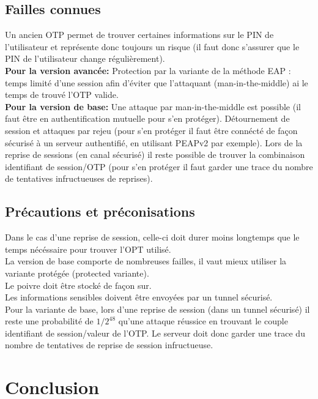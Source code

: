 \documentclass{article}
\begin{document}
\subsection{Failles connues}
    Un ancien OTP permet de trouver certaines informations sur le PIN de l'utilisateur et représente donc toujours un risque (il faut donc s'assurer que le PIN de l'utilisateur change régulièrement).\\

   \textbf{ Pour la version avancée:}
    Protection par la variante de la méthode EAP : temps limité d'une session afin d'éviter que l'attaquant (man-in-the-middle) ai le temps de trouvé l'OTP valide.\\
    
    \textbf{Pour la version de base:}
    Une attaque par man-in-the-middle est possible (il faut être en authentification mutuelle pour s'en protéger).
    Détournement de session et attaques par rejeu (pour s'en protéger il faut être connécté de façon sécurisé à un serveur authentifié, en utilisant PEAPv2 par exemple).
    Lors de la reprise de sessions (en canal sécurisé) il reste possible de trouver la combinaison identifiant de session/OTP (pour s'en protéger il faut garder une trace du nombre de tentatives infructueuses de reprises).

\subsection{Précautions et préconisations}
    Dans le cas d'une reprise de session, celle-ci doit durer moins longtemps que le temps nécéssaire pour trouver l'OPT utilisé.\\
    La version de base comporte de nombreuses failles, il vaut mieux utiliser la variante protégée (protected variante).\\
    Le poivre doit être stocké de façon sur.\\
    Les informations sensibles doivent être envoyées par un tunnel sécurisé.\\
    
    Pour la variante de base, lors d'une reprise de session (dans un tunnel sécurisé) il reste une probabilité de $1/2^48$ qu'une attaque réussice en trouvant le couple identifiant de session/valeur de l'OTP. Le serveur doit donc garder une trace du nombre de tentatives de reprise de session infructueuse.\\

\section{Conclusion}
\end{document}
